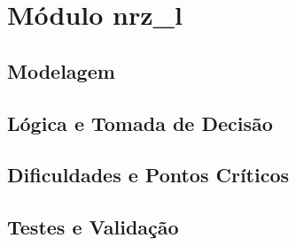 ﻿%
\section{Módulo nrz_l}
\subsection{Modelagem}
\subsection{Lógica e Tomada de Decisão}
\subsection{Dificuldades e Pontos Críticos}
\subsection{Testes e Validação}

